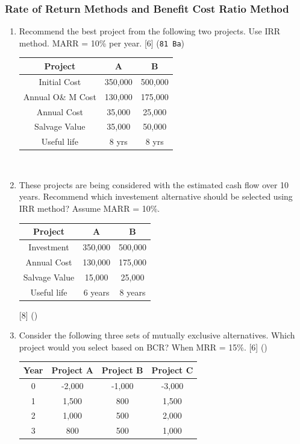 \documentclass[12pt]{article}
\begin{document}
	\subsubsection{Rate of Return Methods and Benefit Cost Ratio Method}
	\begin{enumerate}
		\item Recommend the best project from the following two projects. Use IRR method. MARR = 10\% per year. \hfill [6] (\texttt{81 Ba})\\
		\begin{tabular}{|c|c|c|}
			\hline
			Project & A & B \\ \hline
			Initial Cost & 350,000 & 500,000 \\ \hline
			Annual O\& M Cost & 130,000 & 175,000 \\ \hline
			Annual Cost & 35,000 & 25,000 \\ \hline
			Salvage Value & 35,000 & 50,000 \\ \hline
			Useful life & 8 yrs & 8 yrs \\ \hline
		\end{tabular}\\
		
		\item These projects are being considered with the estimated cash flow over 10 years. Recommend which investement alternative should be selected using IRR method? Assume MARR = 10\%. 
		\begin{tabular}{|c|c|c|}
			\hline
			Project & A & B \\ \hline
			Investment & 350,000 & 500,000 \\ \hline
			Annual Cost & 130,000 & 175,000 \\ \hline
			Salvage Value & 15,000 & 25,000 \\ \hline
			Useful life & 6 years & 8 years \\ \hline			
		\end{tabular}		
		\hfill [8] ()
		
		\item Consider the following three sets of mutually exclusive alternatives. Which project would you select based on BCR? When MRR = 15\%. \hfill [6] ()\\
		\begin{tabular}{|c|c|c|c|}
			\hline
			Year & Project A & Project B & Project C \\ \hline
			0 & -2,000 & -1,000 & -3,000 \\ \hline
			1 & 1,500 & 800 & 1,500 \\ \hline
			2 & 1,000 & 500 & 2,000 \\ \hline
			3 & 800 & 500 & 1,000 \\ \hline
		\end{tabular}
		

\end{enumerate}
\end{document}
